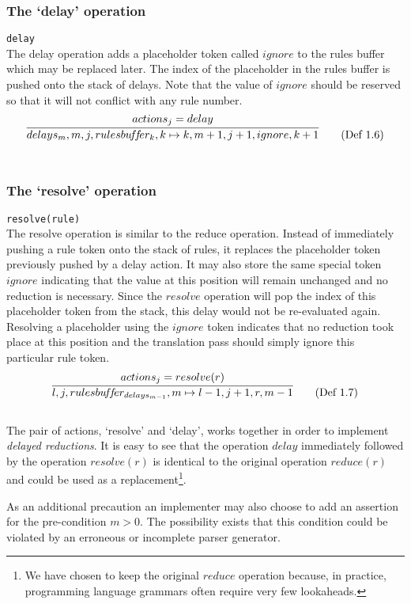 \documentclass[a4paper,11pt]{article}
\begin{document}
\subsubsection{The `delay' operation}
\texttt{delay}\\
The delay operation adds a placeholder token called $ignore$ to the rules buffer which may be replaced later.
The index of the placeholder in the rules buffer is pushed onto the stack of delays.
Note that the value of $ignore$ should be reserved so that it will not conflict with any rule number.
\begin{equation}
\infer{delays_m, m, j, rulesbu\!f\!f\!er_k, k \mapsto k, m+1, j+1, ignore, k+1}{actions_j = delay} \tag{Def 1.6}
\end{equation}\\

\subsubsection{The `resolve' operation}
\texttt{resolve(rule)}\\
The resolve operation is similar to the reduce operation. 
Instead of immediately pushing a rule token onto the stack of rules, it replaces the placeholder token previously pushed by a delay action.
It may also store the same special token $ignore$ indicating that the value at this position will remain unchanged and no reduction is necessary. 
Since the $resolve$ operation will pop the index of this placeholder token from the stack, this delay would not be re-evaluated again. 
Resolving a placeholder using the $ignore$ token indicates that no reduction took place at this position and the translation pass should simply ignore this particular rule token.
\begin{equation}
\infer{l, j, rulesbu\!f\!f\!er_{delays_{m-1}}, m \mapsto l-1, j+1, r, m-1}{actions_j = resolve(r)} \tag{Def 1.7}
\end{equation}\\

The pair of actions, `resolve' and `delay', works together in order to implement \emph{delayed reductions}. 
It is easy to see that the operation $delay$ immediately followed by the operation $resolve(r)$ is identical to the original operation $reduce(r)$ and could be used as a replacement\footnote{We have chosen to keep the original $reduce$ operation because, in practice, programming language grammars often require very few lookaheads.}.

As an additional precaution an implementer may also choose to add an assertion for the pre-condition $m > 0$. The possibility exists that this condition could be violated by an erroneous or incomplete parser generator.
\end{document}
